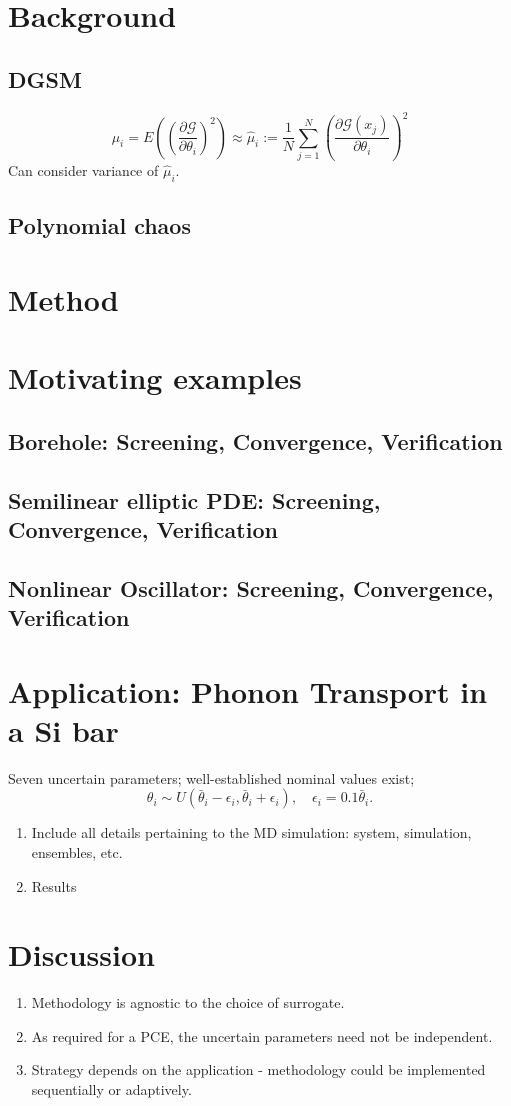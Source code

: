\documentclass[letter,12pt]{article}
\begin{document}


\tableofcontents



\section{Background}
\subsection{DGSM}
\[ 
    \mu_i = E\left(\left( \frac{\partial \mathcal{G}}{\partial \theta_i}\right)^2\right)
          \approx \hat\mu_i := \frac1N\sum_{j = 1}^N 
                  \left(\frac{\partial \mathcal{G}(x_j)}{\partial \theta_i}\right)^2
\]
Can consider variance of $\hat\mu_i$.

\subsection{Polynomial chaos}
\section{Method}

\section{Motivating examples}
\subsection{Borehole: Screening, Convergence, Verification}
\subsection{Semilinear elliptic PDE: Screening, Convergence, Verification}
\subsection{Nonlinear Oscillator: Screening, Convergence, Verification}

\section{Application: Phonon Transport in a Si bar}

Seven uncertain parameters; well-established nominal values exist;
\[
   \theta_i \sim U(\bar\theta_i - \epsilon_i, \bar\theta_i + \epsilon_i), 
   \quad \epsilon_i = 0.1 \bar\theta_i. 
\]
\begin{enumerate}
\item Include all details pertaining to the MD simulation: system, simulation, 
ensembles, etc. 
\item Results
\end{enumerate}

\section{Discussion}
\begin{enumerate}
\item Methodology is agnostic to the choice of surrogate.
\item As required for a PCE, the uncertain parameters need not be independent. 
\item Strategy depends on the application - methodology could be implemented 
sequentially or adaptively. 
\end{enumerate}
\end{document}
